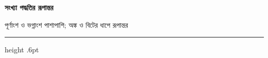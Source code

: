 \documentclass[12pt]{article}
\begin{document}
{\Large\bfseries সংখ্যা পদ্ধতির রূপান্তর}\par
{\color{CVAccent}পূর্ণাংশ ও ভগ্নাংশ পাশাপাশি; অঙ্ক ও বিটের ধাপে রূপান্তর}\par
\vspace{2mm}\hrule height .6pt\vspace{4mm}

\end{document}

